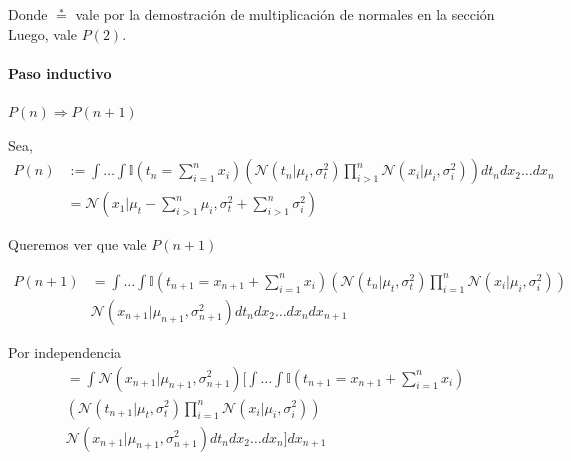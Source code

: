 \documentclass[11pt,twoside,spanish]{report} %
\begin{document}
Donde $\overset{*}{=}$ vale por la demostraci\'on de multiplicaci\'on de normales en la secci\'on 
Luego, vale $P(2)$.


\paragraph{Paso inductivo} $P(n) \Rightarrow P(n+1)$

Sea,
\begin{equation}
	\begin{split}
		P(n) &:=\int \dots \int \mathbb{I}(t_n= \sum_{i=1}^n x_i ) \left( \mathcal{N}(t_n|\mu_t,\sigma_t^2)\prod_{i>1}^n \mathcal{N}(x_i|\mu_i,\sigma_i^2) \right)  dt_ndx_2 \dots dx_n\\ &=\mathcal{N}\left(x_1|\mu_t-\sum_{i>1}^n \mu_i,\sigma_t^2+\sum_{i>1}^n\sigma_i^2\right)
	\end{split}
\end{equation}

Queremos ver que vale $P(n+1)$

\begin{equation}
	\begin{split}
		P(n+1) &= \int \dots \int \mathbb{I}(t_{n+1}=  x_{n+1} + \sum_{i=1}^{n} x_i ) \left(\mathcal{N}(t_n|\mu_t,\sigma_t^2) \prod_{i=1}^{n} \mathcal{N}(x_i|\mu_i,\sigma_i^2) \right)\\
		& \mathcal{N}(x_{n+1}|\mu_{n+1},\sigma_{n+1}^2) dt_ndx_2 \dots dx_{n} dx_{n+1}
	\end{split}
\end{equation}

Por independencia
\begin{equation}
	\begin{split}
		&= \int \mathcal{N}(x_{n+1}|\mu_{n+1},\sigma_{n+1}^2)\Big[ \int \dots \int \mathbb{I}(t_{n+1}=  x_{n+1} + \sum_{i=1}^{n} x_i ) \\
		&\left(\mathcal{N}(t_{n+1}|\mu_t,\sigma_t^2) \prod_{i=1}^{n} \mathcal{N}(x_i|\mu_i,\sigma_i^2) \right)\\
		& \mathcal{N}(x_{n+1}|\mu_{n+1},\sigma_{n+1}^2) dt_ndx_2 \dots dx_{n} \Big] dx_{n+1}
	\end{split}
\end{equation}
\end{document}
